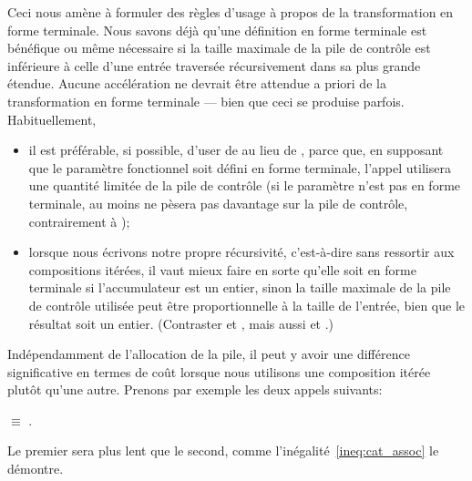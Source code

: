Ceci nous amène à formuler des règles d'usage à propos de la
transformation en forme terminale. Nous savons déjà qu'une définition
en forme terminale est bénéfique ou même nécessaire si la taille
maximale de la pile de contrôle est inférieure à celle d'une entrée
traversée récursivement dans sa plus grande étendue. Aucune
accélération ne devrait être attendue a priori de la transformation en
forme terminale --- bien que ceci se produise parfois. Habituellement,
\begin{itemize}

  \item il est préférable, si possible, d'user de  au
  lieu de , parce que, en supposant que le paramètre
  fonctionnel soit défini en forme terminale, l'appel utilisera une
  quantité limitée de la pile de contrôle (si le paramètre n'est pas
  en forme terminale, au moins  ne pèsera pas
  davantage sur la pile de contrôle, contrairement à
  );

  \item lorsque nous écrivons notre propre récursivité, c'est-à-dire
  sans ressortir aux compositions itérées, il vaut mieux faire en
  sorte qu'elle soit en forme terminale si l'accumulateur est un
  entier, sinon la taille maximale de la pile de contrôle utilisée peut
  être proportionnelle à la taille de l'entrée, bien que le résultat
  soit un entier. (Contraster  et ,
  mais aussi  et .)

\end{itemize}
Indépendamment de l'allocation de la pile, il peut y avoir une
différence significative en termes de coût lorsque nous utilisons une
composition itérée plutôt qu'une autre. Prenons par exemple les deux
appels suivants:
\begin{center}
\(\equiv\)
.
\end{center}
Le premier sera plus lent que le second, comme
l'inégalité~\eqref{ineq:cat_assoc}  le
démontre.

